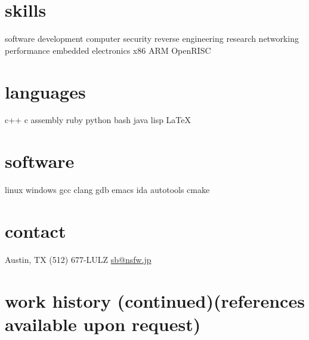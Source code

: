 \documentclass[]{friggeri-cv}
\begin{document}
\newpage
\begin{aside}
  \section{skills}
  software development
  computer security
  reverse engineering
  research
  networking
  performance
  embedded
  electronics
  x86
  ARM
  OpenRISC
  \section{languages}
  c++
  c
  assembly
  ruby
  python
  bash
  java
  lisp
  \LaTeX
  \section{software}
  linux
  windows
  gcc
  clang
  gdb
  emacs
  ida
  autotools
  cmake
  \section{contact}
  Austin, TX
  (512) 677-LULZ
  \href{mailto:sb@nsfw.jp}{sb@nsfw.jp}
\end{aside}
\section{work history {\footnotesize (continued)}\hfill {\footnotesize{}(references available upon request)}}
\end{document}
